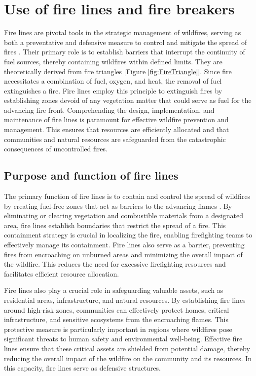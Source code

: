 \documentclass[
  12 pt,
]{Nemilov}
\begin{document}
\section{Use of fire lines and fire breakers}\label{use-of-fire-lines-and-fire-breakers}

Fire lines are pivotal tools in the strategic management of wildfires, serving as both a preventative and defensive measure to control and mitigate the spread of fires \citep{plucinski2019fighting}. Their primary role is to establish barriers that interrupt the continuity of fuel sources, thereby containing wildfires within defined limits. They are theoretically derived from fire triangles {[}Figure \ref{fig:FireTriangle}{]}. Since fire necessitates a combination of fuel, oxygen, and heat, the removal of fuel extinguishes a fire. Fire lines employ this principle to extinguish fires by establishing zones devoid of any vegetation matter that could serve as fuel for the advancing fire front. Comprehending the design, implementation, and maintenance of fire lines is paramount for effective wildfire prevention and management. This ensures that resources are efficiently allocated and that communities and natural resources are safeguarded from the catastrophic consequences of uncontrolled fires.

\subsection{Purpose and function of fire lines}\label{purpose-and-function-of-fire-lines}

The primary function of fire lines is to contain and control the spread of wildfires by creating fuel-free zones that act as barriers to the advancing flames \citep{lemons2023evaluating}. By eliminating or clearing vegetation and combustible materials from a designated area, fire lines establish boundaries that restrict the spread of a fire. This containment strategy is crucial in localizing the fire, enabling firefighting teams to effectively manage its containment. Fire lines also serve as a barrier, preventing fires from encroaching on unburned areas and minimizing the overall impact of the wildfire. This reduces the need for excessive firefighting resources and facilitates efficient resource allocation.

Fire lines also play a crucial role in safeguarding valuable assets, such as residential areas, infrastructure, and natural resources. By establishing fire lines around high-risk zones, communities can effectively protect homes, critical infrastructure, and sensitive ecosystems from the encroaching flames. This protective measure is particularly important in regions where wildfires pose significant threats to human safety and environmental well-being. Effective fire lines ensure that these critical assets are shielded from potential damage, thereby reducing the overall impact of the wildfire on the community and its resources. In this capacity, fire lines serve as defensive structures.
\end{document}
